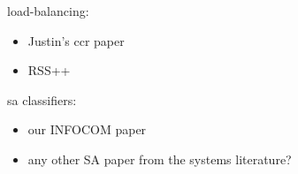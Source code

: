 load-balancing:
\begin{itemize}
\item Justin's ccr paper
\item RSS++
\end{itemize}

sa classifiers:
\begin{itemize}
\item our INFOCOM paper
\item any other SA paper from the systems literature?
\end{itemize}







